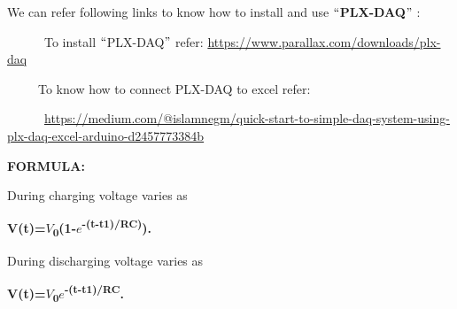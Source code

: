 \documentclass[12pt]{article}
\begin{document}
\vspace{\baselineskip}
{\fontsize{14pt}{16.8pt}\selectfont We can refer following links to know how to install and use \textbf{$``$PLX-DAQ$"$ }:\par}\par

\vspace{\baselineskip}

\vspace{\baselineskip}
{\fontsize{14pt}{16.8pt}\selectfont \ \ \ \ \ \  To install $``$PLX-DAQ$"$  refer: \href{https://www.parallax.com/downloads/plx-daq}{https://www.parallax.com/downloads/plx-daq}\par}\par

\vspace{\baselineskip}
{\fontsize{14pt}{16.8pt}\selectfont \ \ \ \ \  To know how to connect PLX-DAQ to excel refer: \par}\par

{\fontsize{14pt}{16.8pt}\selectfont \ \ \ \ \ \  \href{https://medium.com/@islamnegm/quick-start-to-simple-daq-system-using-plx-daq-excel-arduino-d2457773384b}{https://medium.com/@islamnegm/quick-start-to-simple-daq-system-using-plx-daq-excel-arduino-d2457773384b}\par}

\newpage
\par

{\fontsize{14pt}{16.8pt}\selectfont \textbf{FORMULA:}\par}\par


\vspace{\baselineskip}
{\fontsize{14pt}{16.8pt}\selectfont During charging voltage varies as \par}\par

\vspace{\baselineskip}
{\fontsize{17.28pt}{21.6pt}\selectfont \textbf{V(t)=$V$\textsubscript{0}(1-$e$\textsuperscript{-(t-t1)/RC)}).}\par}\par

\vspace{\baselineskip}
{\fontsize{14pt}{16.8pt}\selectfont During discharging voltage varies as \par}\par

\vspace{\baselineskip}
{\fontsize{17.28pt}{21.6pt}\selectfont \textbf{V(t)=$V$\textsubscript{0}$e$\textsuperscript{-(t-t1)/RC}.}\par}\par
\end{document}
